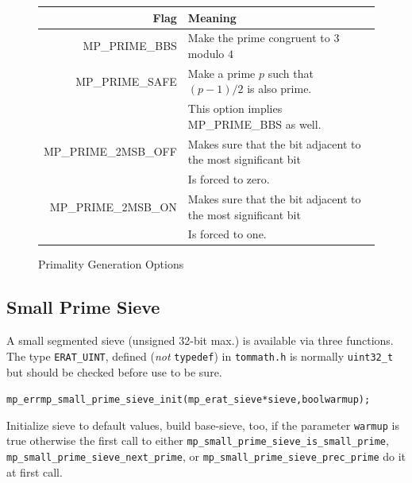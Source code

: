 \documentclass[synpaper]{book}
\begin{document}
\begin{figure}[h]
  \begin{center}
    \begin{small}
      \begin{tabular}{|r|l|}
        \hline \textbf{Flag}        & \textbf{Meaning}
        \\
        \hline MP\_PRIME\_BBS       & Make the prime congruent to $3$ modulo $4$
        \\
        \hline MP\_PRIME\_SAFE      & Make a prime $p$ such that $(p - 1)/2$ is also prime.
        \\
                                    & This option implies MP\_PRIME\_BBS as well.
        \\
        \hline MP\_PRIME\_2MSB\_OFF & Makes sure that the bit adjacent to the most significant bit
        \\
                                    & Is forced to zero.
        \\
        \hline MP\_PRIME\_2MSB\_ON  & Makes sure that the bit adjacent to the most significant bit
        \\
                                    & Is forced to one.
        \\
        \hline
      \end{tabular}
    \end{small}
  \end{center}
  \caption{Primality Generation Options}
  \label{fig:primeopts}
\end{figure}

\subsection{Small Prime Sieve}
A small segmented sieve (unsigned 32-bit max.) is available via three functions.
The type {\texttt{ERAT\_UINT}}, defined (\emph{not} {\texttt{typedef}}) in {\texttt{tommath.h}}
is normally {\texttt{uint32\_t}} but should be checked before use to be sure.


\begin{alltt}
mp_err mp_small_prime_sieve_init(mp_erat_sieve *sieve, bool warmup);
\end{alltt}
Initialize sieve to default values, build base-sieve, too, if the parameter {\texttt{warmup}} is true
otherwise the first call to either {\texttt{mp\_small\_prime\_sieve\_is\_small\_prime}},
{\texttt{mp\_small\_prime\_sieve\_next\_prime}}, or {\texttt{mp\_small\_prime\_sieve\_prec\_prime}}
do it at first call.
\end{document}
